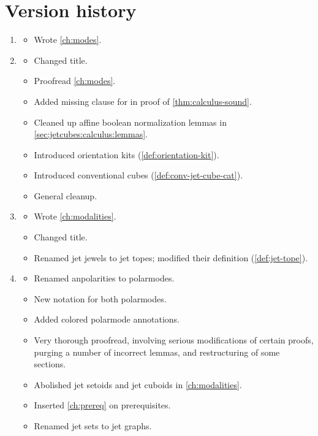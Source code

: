 \documentclass[a4paper]{memoir}
\begin{document}
\chapter{Version history}
\begin{enumerate}
	\item[v0.1]
	\begin{itemize}
		\item Wrote \cref{ch:modes}.
	\end{itemize}
	\item[v0.1.1]
	\begin{itemize}
		\item Changed title.
		\item Proofread \cref{ch:modes}.
		\item Added missing clause for  in proof of \cref{thm:calculus-sound}.
		\item Cleaned up affine boolean normalization lemmas in \cref{sec:jetcubes:calculus:lemmas}.
		\item Introduced orientation kits (\cref{def:orientation-kit}).
		\item Introduced conventional cubes (\cref{def:conv-jet-cube-cat}).
		\item General cleanup.
	\end{itemize}
	\item[v0.2]
	\begin{itemize}
		\item Wrote \cref{ch:modalities}.
		\item Changed title.
		\item Renamed jet jewels to jet topes; modified their definition (\cref{def:jet-tope}).
	\end{itemize}
	\item[v0.3]
	\begin{itemize}
		\item Renamed anpolarities to polarmodes.
		\item New notation for both polarmodes.
		\item Added colored polarmode annotations.
		\item Very thorough proofread, involving serious modifications of certain proofs, purging a number of incorrect lemmas, and restructuring of some sections.
		\item Abolished jet setoids and jet cuboids in \cref{ch:modalities}.
		\item Inserted \cref{ch:prereq} on prerequisites.
		\item Renamed jet sets to jet graphs.
	\end{itemize}
\end{enumerate}



\end{document}
